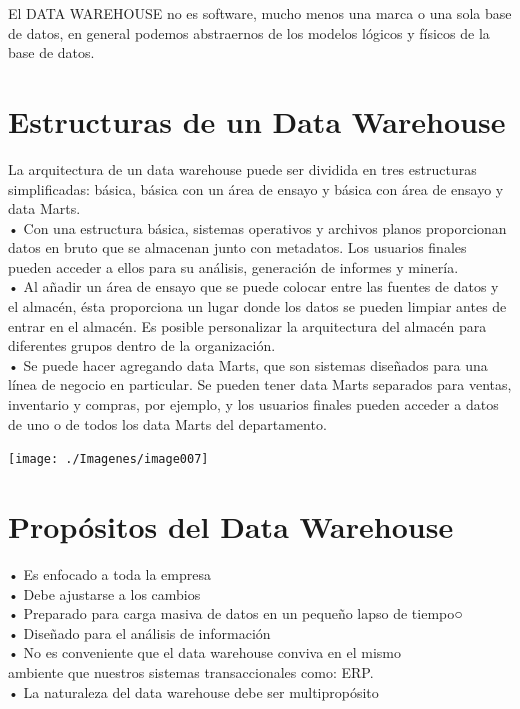 El DATA WAREHOUSE no es software, mucho menos una marca o una sola base de datos, en general podemos abstraernos de los modelos lógicos y físicos de la base de datos.
 
\section{Estructuras de un Data Warehouse}
La arquitectura de un data warehouse puede ser dividida en tres estructuras simplificadas: básica, básica con un área de ensayo y básica con área de ensayo y data Marts.\\
•	Con una estructura básica, sistemas operativos y archivos planos proporcionan datos en bruto que se almacenan junto con metadatos. Los usuarios finales pueden acceder a ellos para su análisis, generación de informes y minería.\\
•	Al añadir un área de ensayo que se puede colocar entre las fuentes de datos y el almacén, ésta proporciona un lugar donde los datos se pueden limpiar antes de entrar en el almacén. Es posible personalizar la arquitectura del almacén para diferentes grupos dentro de la organización.\\
•	Se puede hacer agregando data Marts, que son sistemas diseñados para una línea de negocio en particular. Se pueden tener data Marts separados para ventas, inventario y compras, por ejemplo, y los usuarios finales pueden acceder a datos de uno o de todos los data Marts del departamento.\\
\begin{center}
\texttt{[image: ./Imagenes/image007]}
\end{center}
 
\section{Propósitos del Data Warehouse}
•	Es enfocado a toda la empresa\\
•	Debe ajustarse a los cambios\\
•	Preparado para carga masiva de datos en un pequeño lapso de tiempo○\\
•	Diseñado para el análisis de información\\
•	No es conveniente que el data warehouse conviva en el mismo\\ ambiente que nuestros sistemas transaccionales como: ERP.\\
•	La naturaleza del data warehouse debe ser multipropósito\\

